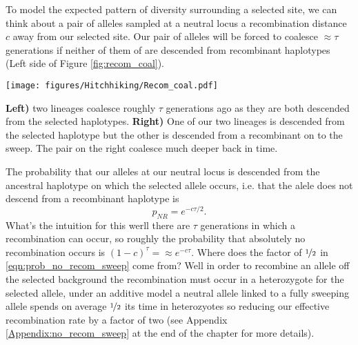 To model the expected pattern of diversity surrounding a selected site, we can think about a pair
of alleles sampled at a neutral locus a recombination distance $c$
away from our selected site. Our pair of alleles will be forced to
coalesce $\approx \tau$ generations if neither of them of are
descended from recombinant haplotypes (Left side of Figure \ref{fig:recom_coal}).\\
\begin{marginfigure}
\begin{center}
\texttt{[image: figures/Hitchhiking/Recom\_coal.pdf]}
\end{center}
\caption{{\bf Left)} two lineages coalesce roughly $\tau$ generations
  ago as they are both descended from the selected haplotypes. {\bf Right)}
One of our two lineages is descended from the selected haplotype but
the other is descended from a recombinant on to the sweep. The pair on
the right coalesce much deeper back in time.} \label{fig:recom_coal}
\end{marginfigure}
The probability that our alleles at our neutral locus is descended
from the ancestral haplotype on which the selected allele occurs,
i.e. that the alele does not descend from a recombinant haplotype is
\begin{equation}
p_{NR} = e^{-c \tau/2 }. \label{eqn:prob_no_recom_sweep}
\end{equation}
What's the intuition for this werll there are $\tau$ generations in
which a recombination can occur, so roughly the probability that
absolutely no recombination occurs is $(1-c)^{\tau} =\approx
e^{-c\tau}$. Where does the factor of $\nicefrac{1}{2}$ in \eqn
\eqref{eqn:prob_no_recom_sweep} come from? Well in order to recombine an allele off the selected background the
recombination must occur in a heterozygote for the selected allele,
under an additive model a neutral allele linked to a fully sweeping allele
spends on average $\nicefrac{1}{2}$ its time in heterozyotes so
reducing our effective recombination rate by a factor of two (see
Appendix \ref{Appendix:no_recom_sweep} at the end of the chapter for
more details).\\

